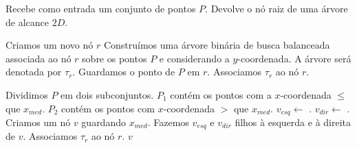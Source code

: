 \begin{algorithm}[h!]
    \caption{Recebe como entrada um conjunto de pontos $P$. Devolve o nó raiz de uma árvore de alcance $2D$.}
    \begin{algorithmic}[1]
    \State Criamos um novo nó $r$
        \State Construímos uma árvore binária de busca balanceada associada ao nó $r$ sobre os pontos $P$ e considerando a $y$-coordenada. A árvore será denotada por $\tau_r$.%
            \State Guardamos o ponto de $P$ em $r$.
            \State Associamos $\tau_r$ ao nó $r$. %
            
        \Else
            \State Dividimos $P$ em dois subconjuntos. 
            \State $P_1$ contém os pontos com a $x$-coordenada $\leq$ que $x_{med}$.
            \State $P_2$ contém os pontos com $x$-coordenada $>$ que $x_{med}$.
            \State $v_{esq} \leftarrow $ .
            \State $v_{dir} \leftarrow $ .
            \State Criamos um nó $v$ guardando $x_{med}$.
            \State Fazemos $v_{esq}$ e $v_{dir}$ filhos à esquerda e à direita de $v$.
            \State Associamos $\tau_{r}$ ao nó $r$.
        \EndIf
    \State\Return $v$
    \EndFunction
    \end{algorithmic}
\end{algorithm}


